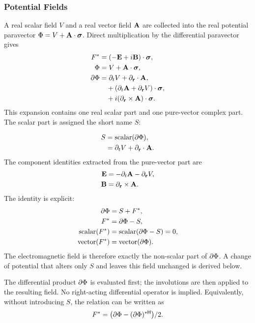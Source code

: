 \subsubsection{Potential Fields}
A real scalar field \(V\) and a real vector field \(\mathbf{A}\) are collected
into the real potential paravector
\(\Phi=V+\mathbf{A}\cdot\mathbf{\bm{\sigma}}\). Direct multiplication by the
differential paravector gives
\begin{align*}
F^{*} &= (-\mathbf{E} + i \mathbf{B}) \cdot \mathbf{\bm{\sigma}},\notag \\
\Phi &= V + \mathbf{A} \cdot \mathbf{\bm{\sigma}},\notag \\
\partial\Phi &= \partial _{t} V + \partial_{\mathbf{r}} \cdot \mathbf{A},\notag \\
&\quad + ( \partial _{t} \mathbf{A} + \partial_{\mathbf{r}} V ) \cdot \mathbf{\bm{\sigma}},\notag \\
&\quad + i ( \partial_{\mathbf{r}} \times \mathbf{A} ) \cdot \mathbf{\bm{\sigma}}.
\end{align*}
This expansion contains one real scalar part and one pure-vector complex
part. The scalar part is assigned the short name \(S\):

\begin{align*}
S &= \operatorname{scalar}( \partial\Phi ),\notag \\
&= \partial _{t} V + \partial_{\mathbf{r}} \cdot \mathbf{A}.
\end{align*}
The component identities extracted from the pure-vector part are
\begin{align*}
\mathbf{E} &= - \partial _{t} \mathbf{A} - \partial_{\mathbf{r}} V, \\
\mathbf{B} &= \partial_{\mathbf{r}} \times \mathbf{A}.
\end{align*}
The identity is explicit:
\begin{align*}
\partial\Phi &= S + F^{*}, \\
F^{*} &= \partial\Phi - S, \\
\operatorname{scalar}(F^{*}) &= \operatorname{scalar}(\partial\Phi - S) = 0, \\
\operatorname{vector}(F^{*}) &= \operatorname{vector}( \partial\Phi ).
\end{align*}
The electromagnetic field is therefore exactly the non-scalar part of
\(\partial\Phi\). A change of potential that alters only \(S\)
and leaves this field unchanged is derived below.


The differential product \(\partial\Phi\) is evaluated first; the involutions are then applied to the resulting field. No right-acting differential operator is implied.
Equivalently, without introducing \(S\), the relation can be written as
\begin{equation*}
F^{*}
=\bigl(\partial\Phi
-(\partial\Phi)^{*\mathsf H}\bigr)/2.
\end{equation*}

